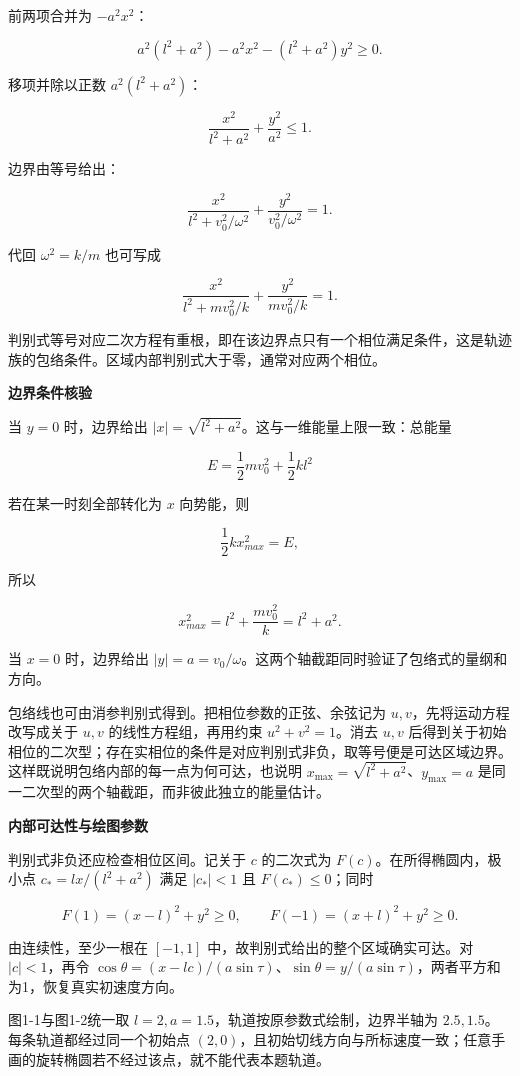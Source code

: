 \documentclass[12pt,a4paper,UTF8]{ctexart}
\begin{document}
前两项合并为 \(-a^2x^2\)：

\[a^2(l^2+a^2)-a^2x^2-(l^2+a^2)y^2\ge0.\]

移项并除以正数 \(a^2(l^2+a^2)\)：

\[\frac{x^2}{l^2+a^2}+\frac{y^2}{a^2}\le1.\]

边界由等号给出：

\[\boxed{
\frac{x^2}{l^2+v_0^2/\omega^2}
+\frac{y^2}{v_0^2/\omega^2}=1
}.\]

代回 \(\omega^2=k/m\) 也可写成

\[\boxed{
\frac{x^2}{l^2+mv_0^2/k}
+\frac{y^2}{mv_0^2/k}=1
}.\]

判别式等号对应二次方程有重根，即在该边界点只有一个相位满足条件，这是轨迹族的包络条件。区域内部判别式大于零，通常对应两个相位。

\textbf{边界条件核验}

当 \(y=0\) 时，边界给出
\(|x|=\sqrt{l^2+a^2}\)。这与一维能量上限一致：总能量

\[E=\frac12mv_0^2+\frac12kl^2\]

若在某一时刻全部转化为 \(x\) 向势能，则

\[\frac12kx_{max}^2=E,\]

所以

\[x_{max}^2=l^2+\frac{mv_0^2}{k}=l^2+a^2.\]

当 \(x=0\) 时，边界给出
\(|y|=a=v_0/\omega\)。这两个轴截距同时验证了包络式的量纲和方向。

包络线也可由消参判别式得到。把相位参数的正弦、余弦记为
\(u,v\)，先将运动方程改写成关于 \(u,v\) 的线性方程组，再用约束
\(u^2+v^2=1\)。消去 \(u,v\)
后得到关于初始相位的二次型；存在实相位的条件是对应判别式非负，取等号便是可达区域边界。这样既说明包络内部的每一点为何可达，也说明
\(x_{\max}=\sqrt{l^2+a^2}\)、\(y_{\max}=a\)
是同一二次型的两个轴截距，而非彼此独立的能量估计。

\textbf{内部可达性与绘图参数}

判别式非负还应检查相位区间。记关于 \(c\) 的二次式为
\(F(c)\)。在所得椭圆内，极小点 \(c_*=lx/(l^2+a^2)\) 满足 \(|c_*|<1\) 且
\(F(c_*)\le0\)；同时

\[F(1)=(x-l)^2+y^2\ge0,\qquad F(-1)=(x+l)^2+y^2\ge0.\]

由连续性，至少一根在 \([-1,1]\) 中，故判别式给出的整个区域确实可达。对
\(|c|<1\)，再令
\(\cos\theta=(x-lc)/(a\sin\tau)\)、\(\sin\theta=y/(a\sin\tau)\)，两者平方和为1，恢复真实初速度方向。

图1-1与图1-2统一取 \(l=2,a=1.5\)，轨道按原参数式绘制，边界半轴为
\(2.5,1.5\)。每条轨道都经过同一个初始点
\((2,0)\)，且初始切线方向与所标速度一致；任意手画的旋转椭圆若不经过该点，就不能代表本题轨道。
\end{document}
